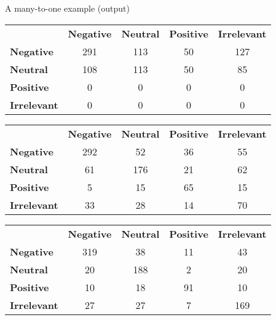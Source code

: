 \documentclass[10pt]{beamer}
\begin{document}
\begin{frame}{A many-to-one example (output)}
\begin{center}
  \begin{tabular}{lcccc}
    {} & {\bf Negative} & {\bf Neutral} & {\bf Positive} & {\bf Irrelevant}\\
    {\bf Negative}   & {291} & {113} & {50} & {127}\\
    {\bf Neutral}    & {108} & {113} & {50} & {85}\\
    {\bf Positive}   & {0} & {0} & {0} & {0}\\
    {\bf Irrelevant} & {0} & {0} & {0} & {0}\\
  \end{tabular}
\end{center}
%
  \begin{center}
  \begin{tabular}{lcccc}
    {} & {\bf Negative} & {\bf Neutral} & {\bf Positive} & {\bf Irrelevant}\\
    {\bf Negative}   & {292} & {52} & {36} & {55}\\
    {\bf Neutral}    & {61} & {176} & {21} & {62}\\
    {\bf Positive}   & {5} & {15} & {65} & {15}\\
    {\bf Irrelevant} & {33} & {28} & {14} & {70}\\
  \end{tabular}
\end{center}

%
  \begin{center}
  \begin{tabular}{lcccc}
    {} & {\bf Negative} & {\bf Neutral} & {\bf Positive} & {\bf Irrelevant}\\
    {\bf Negative}   & {319} & {38} & {11} & {43}\\
    {\bf Neutral}    & {20} & {188} & {2} & {20}\\
    {\bf Positive}   & {10} & {18} & {91} & {10}\\
    {\bf Irrelevant} & {27} & {27} & {7} & {169}\\
  \end{tabular}
\end{center}
\end{frame}
\end{document}
